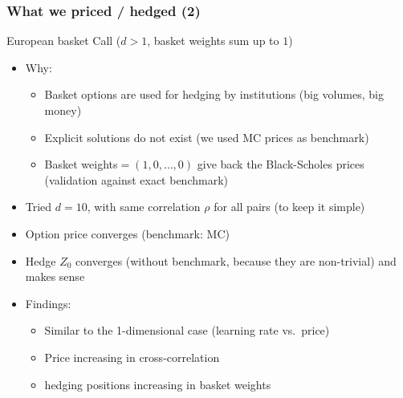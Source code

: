 \documentclass[mathserif,10pt]{beamer}
\begin{document}
\begin{frame}
\frametitle{What we priced / hedged (2)}
\begin{block}{European basket Call ($d>1$, basket weights sum up to $1$)}
\begin{itemize}
\item 
Why: 
\begin{itemize}
\item Basket options are used for hedging by institutions (big volumes, big money)
\item Explicit solutions do not exist (we used MC prices as benchmark)
\item Basket weights$=(1,0,\ldots,0)$ give back the Black-Scholes prices (validation against exact benchmark)
\end{itemize}
\item
Tried $d=10$, with same correlation $\rho$ for all pairs (to keep it simple)
\item 
Option price converges (benchmark: MC)
\item 
Hedge $Z_0$ converges (without benchmark, because they are non-trivial) and makes sense
\item 
Findings: 
\begin{itemize}
\item Similar to the 1-dimensional case (learning rate vs.\ price)
\item Price increasing in cross-correlation
\item hedging positions increasing in basket weights
\end{itemize}
\end{itemize}
\end{block}
\end{frame}
\end{document}
